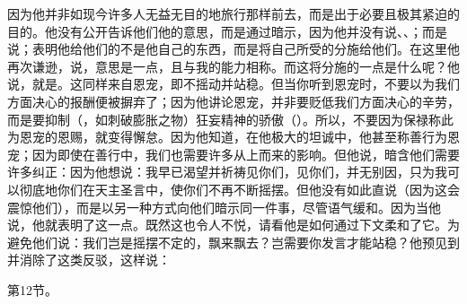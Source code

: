 因为他并非如现今许多人无益无目的地旅行那样前去，而是出于必要且极其紧迫的目的。他没有公开告诉他们他的意思，而是通过暗示，因为他并没有说、、；而是说；表明他给他们的不是他自己的东西，而是将自己所受的分施给他们。在这里他再次谦逊，说，意思是一点，且与我的能力相称。而这将分施的一点是什么呢？他说，就是。这同样来自恩宠，即不摇动并站稳。但当你听到恩宠时，不要以为我们方面决心的报酬便被摒弃了；因为他讲论恩宠，并非要贬低我们方面决心的辛劳，而是要抑制（，如刺破膨胀之物）狂妄精神的骄傲（）。所以，不要因为保禄称此为恩宠的恩赐，就变得懈怠。因为他知道，在他极大的坦诚中，他甚至称善行为恩宠；因为即使在善行中，我们也需要许多从上而来的影响。但他说，暗含他们需要许多纠正：因为他想说：我早已渴望并祈祷见你们，见你们，并无别因，只为我可以彻底地你们在天主圣言中，使你们不再不断摇摆。但他没有如此直说（因为这会震惊他们），而是以另一种方式向他们暗示同一件事，尽管语气缓和。因为当他说，他就表明了这一点。既然这也令人不悦，请看他是如何通过下文柔和了它。为避免他们说：我们岂是摇摆不定的，飘来飘去？岂需要你发言才能站稳？他预见到并消除了这类反驳，这样说：\par

第12节。 \par

